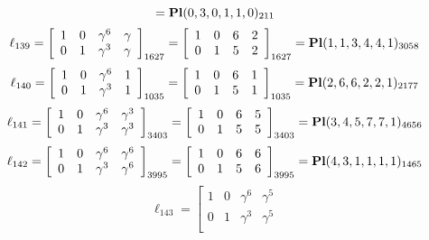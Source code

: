\documentclass{article}
\begin{document}
{$$={\rm\bf Pl}(0,3,0,1,1,0 )_{211}$$
$$
\ell_{139} = 
\left[
\begin{array}{*{4}{r}}
1 & 0 & \gamma^{6} & \gamma \\
0 & 1 & \gamma^{3} & \gamma \\
\end{array}
\right]
_{1627}
=
\left[
\begin{array}{*{4}c}
1  & 0  & 6  & 2\\
0  & 1  & 5  & 2\\
\end{array}
\right]_{1627}
={\rm\bf Pl}(1,1,3,4,4,1 )_{3058}$$
$$
\ell_{140} = 
\left[
\begin{array}{*{4}{r}}
1 & 0 & \gamma^{6} & 1\\
0 & 1 & \gamma^{3} & 1\\
\end{array}
\right]
_{1035}
=
\left[
\begin{array}{*{4}c}
1  & 0  & 6  & 1\\
0  & 1  & 5  & 1\\
\end{array}
\right]_{1035}
={\rm\bf Pl}(2,6,6,2,2,1 )_{2177}$$
$$
\ell_{141} = 
\left[
\begin{array}{*{4}{r}}
1 & 0 & \gamma^{6} & \gamma^{3}\\
0 & 1 & \gamma^{3} & \gamma^{3}\\
\end{array}
\right]
_{3403}
=
\left[
\begin{array}{*{4}c}
1  & 0  & 6  & 5\\
0  & 1  & 5  & 5\\
\end{array}
\right]_{3403}
={\rm\bf Pl}(3,4,5,7,7,1 )_{4656}$$
$$
\ell_{142} = 
\left[
\begin{array}{*{4}{r}}
1 & 0 & \gamma^{6} & \gamma^{6}\\
0 & 1 & \gamma^{3} & \gamma^{6}\\
\end{array}
\right]
_{3995}
=
\left[
\begin{array}{*{4}c}
1  & 0  & 6  & 6\\
0  & 1  & 5  & 6\\
\end{array}
\right]_{3995}
={\rm\bf Pl}(4,3,1,1,1,1 )_{1465}$$
$$
\ell_{143} = 
\left[
\begin{array}{*{4}{r}}
1 & 0 & \gamma^{6} & \gamma^{5}\\
0 & 1 & \gamma^{3} & \gamma^{5}\\

\end{array}$$}
\end{document}
